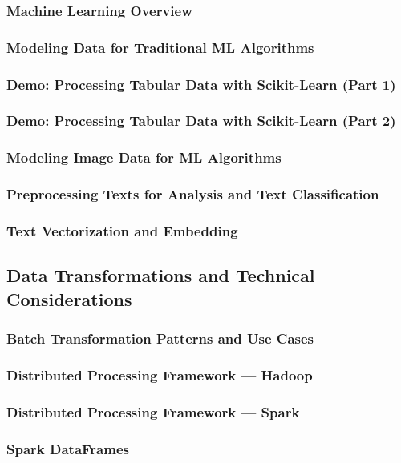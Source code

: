 \subsubsection{Machine Learning Overview}
\subsubsection{Modeling Data for Traditional ML Algorithms}
\subsubsection{Demo: Processing Tabular Data with Scikit-Learn (Part 1)}
\subsubsection{Demo: Processing Tabular Data with Scikit-Learn (Part 2)}
\subsubsection{Modeling Image Data for ML Algorithms}
\subsubsection{Preprocessing Texts for Analysis and Text Classification}
\subsubsection{Text Vectorization and Embedding}

\subsection{Data Transformations and Technical Considerations}
\subsubsection{Batch Transformation Patterns and Use Cases}
\subsubsection{Distributed Processing Framework — Hadoop}
\subsubsection{Distributed Processing Framework — Spark}
\subsubsection{Spark DataFrames}
